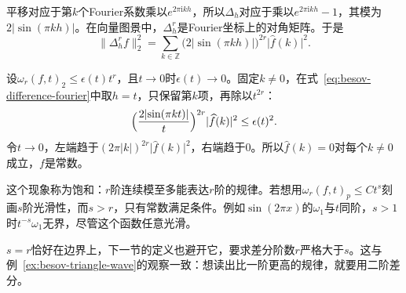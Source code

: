 平移对应于第$k$个Fourier系数乘以$e^{2\pi\mathrm ikh}$，所以$\Delta_h$对应于乘以$e^{2\pi\mathrm ikh}-1$，其模为$2\lvert\sin(\pi kh)\rvert$。在向量图景中，$\Delta_h^r$是Fourier坐标上的对角矩阵。于是
\begin{equation}
 \lVert\Delta_h^rf\rVert_2^2=\sum_{k\in\mathbb Z}\bigl(2\lvert\sin(\pi kh)\rvert\bigr)^{2r}\lvert\widehat f(k)\rvert^2 .
 \label{eq:besov-difference-fourier}
\end{equation}

设$\omega_r(f,t)_2\leq\epsilon(t)t^r$，且$t\to0$时$\epsilon(t)\to0$。固定$k\neq0$，在式~\eqref{eq:besov-difference-fourier}中取$h=t$，只保留第$k$项，再除以$t^{2r}$：
\[
 \Bigl(\frac{2\lvert\sin(\pi kt)\rvert}{t}\Bigr)^{2r}\lvert\widehat f(k)\rvert^2\leq\epsilon(t)^2 .
\]
令$t\to0$，左端趋于$(2\pi\lvert k\rvert)^{2r}\lvert\widehat f(k)\rvert^2$，右端趋于$0$。所以$\widehat f(k)=0$对每个$k\neq0$成立，$f$是常数。

这个现象称为饱和：$r$阶连续模至多能表达$r$阶的规律。若想用$\omega_r(f,t)_p\leq Ct^s$刻画$s$阶光滑性，而$s>r$，只有常数满足条件。例如$\sin(2\pi x)$的$\omega_1$与$t$同阶，$s>1$时$t^{-s}\omega_1$无界，尽管这个函数任意光滑。

$s=r$恰好在边界上，下一节的定义也避开它，要求差分阶数$r$严格大于$s$。这与例~\ref{ex:besov-triangle-wave}的观察一致：想读出比一阶更高的规律，就要用二阶差分。
